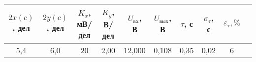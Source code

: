 \begin{tabular}{cccccccccc}
\toprule
$2x(c)$, дел & $2y(c)$, дел & $K_x$, мВ/дел & $K_y$, В/дел & $U_\text{вх}$, В & $U_\text{вых}$, В & $\tau$, с & $\sigma_{\tau}$, с & $\varepsilon_{\tau}, \%$\\
\midrule
5,4 & 6,0 & 20 & 2,00 & 12,000 & 0,108 & 0,35 & 0,02 & 6 \\
\bottomrule
\end{tabular}
